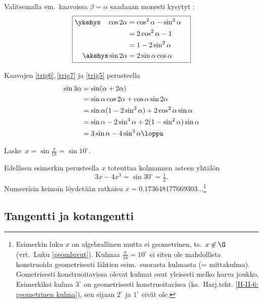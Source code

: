 Valitsemalla em.\ kaavoissa $\beta = \alpha$ saadaaan monesti kysytyt
:
\begin{equation} \label{trig7} \boxed{ \begin{aligned}
\ykehys\quad \cos 2\alpha &= \cos^2\alpha-\sin^2\alpha \quad \\ 
                          &= 2\cos^2 \alpha - 1 \\
                          &= 1-2\sin^2\alpha \quad \\
     \akehys \sin 2\alpha &= 2\sin \alpha \cos \alpha
\end{aligned} } \end{equation}
\begin{Exa} \label{sin kolme alpha} Kaavojen \eqref{trig6},\,\eqref{trig7} ja \eqref{trig5}
perusteella
\begin{align*}
\sin 3\alpha &= \sin (\alpha + 2\alpha) \\
&= \sin \alpha \cos 2\alpha + \cos \alpha \sin 2\alpha \\
&= \sin \alpha(1-2\sin^2 \alpha) + 2\cos^2 \alpha \sin \alpha \\
&= \sin \alpha - 2\sin^3 \alpha + 2(1-\sin^2 \alpha) \sin \alpha \\
&= 3\sin\alpha - 4\sin^3\alpha \loppu
\end{align*}
\end{Exa}
\begin{Exa} \label{kulman kolmijako}
Laske $\,x = \sin\frac{\pi}{18} = \sin 10^{\circ}$.
\end{Exa}
\ratk Edellisen esimerkin perusteella $x$ toteuttaa kolmannen asteen yhtälön
\[
3x - 4x^3 = \sin 30^{\circ} = \tfrac{1}{2}.
\]
Numeerisin keinoin löydetään ratkaisu $x=0.173648177669303 \ldots$\footnote[1]{Esimerkin luku
$x$ on algebrallinen mutta ei geometrinen, ts.\ $x \not\in\G$ (vrt.\ Luku \ref{geomluvut}). 
Kulmaa $\frac{\pi}{18} = 10^{\circ}$ ei siten ole mahdollista konstruoida geometrisesti lähtien
esim.\ suorasta kulmasta (= mittakulma). Gometrisesti konstruoitavissa olevat kulmat ovat 
yleisesti melko harva joukko. Esimerkiksi kulma $3^{\circ}$ on geometrisesti konstruoitavissa
(ks.\ Harj.teht. \ref{H-II-6: geometrinen kulma}), sen sijaan $2^{\circ}$ ja $1^{\circ}$ eivät
ole.} \loppu

\subsection{Tangentti ja kotangentti}

